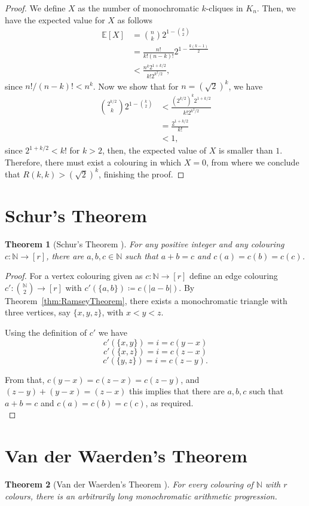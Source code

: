 \documentclass[12pt,twoside,a4paper,bibliography=totocnumbered]{book}
\numberwithin{equation}{section}
\newtheorem{theorem}             {Theorem}[section]
\theoremstyle{remark}
\begin{document}
\begin{proof}
We define $X$ as the number of monochromatic $k$-cliques in $K_n$. Then, we have the expected value for $X$ as follows
\begin{align*}
\mathbb{E}[X] &= \binom{n}{k}2^{1-\binom{k}{2}}\\ 
&= \frac{n!}{k!(n-k)!}2^{1-\frac{k(k-1)}{2}}\\ 
&< \frac{n^k 2^{1 +k/2}}{k!2^{k^2/2}},
\end{align*}
since $n!/(n-k)! < n^k$. Now we show that for $n = (\sqrt{2})^k$, we have
\begin{align*}
\binom{2^{k/2}}{k}2^{1-\binom{k}{2}}&< \frac{(2^{k/2})^k 2^{1+k/2}}{k! 2^{k^2/2}}\\ 
&= \frac{2^{1+k/2}}{k!}\\ 
&< 1,
\end{align*}
since $2^{1+k/2} < k!$ for $k>2$, then, the expected value of $X$ is smaller than $1$. Therefore, there must exist a colouring in which $X=0$, from where we conclude that $R(k,k) > (\sqrt{2})^k$, finishing the proof.
\end{proof}

\section{Schur's Theorem}
\begin{theorem}[{Schur's Theorem \cite{Sc16}}]\label{thm:Schur'sTheorem} %
For any positive integer and any colouring $c\colon \mathbb{N} \rightarrow [r]$, there are $a,b,c \in \mathbb{N}$ such that $a+b=c$ and $c(a) = c(b) = c(c)$.
\end{theorem}
\begin{proof}
  For a vertex colouring given as $c\colon \mathbb{N} \rightarrow [r]$ define an edge colouring $c'\colon \binom{\mathbb{N}}{2} \rightarrow [r]$ with $c'(\{a,b\}) \coloneqq c(|a-b|)$. By Theorem~\ref{thm:RamseyTheorem}, there exists a monochromatic triangle with three vertices, say $\{x,y,z\}$, with $x<y<z$.
  
Using the definition of $c'$  we have
$$c'(\{x,y\}) = i = c(y-x)$$
$$c'(\{x,z\})=  i = c(z-x)$$
$$c'(\{y,z\}) = i = c(z-y).$$

From that, $c(y-x) = c(z-x) = c(z-y)$, and $(z-y)+(y-x)=(z-x)$ this implies that there are $a,b,c$ such that $a+b=c$ and $c(a) = c(b) = c(c)$, as required.\\
\end{proof}

\section{Van der Waerden's Theorem}
\begin{theorem}[{Van der Waerden's Theorem \cite{Van27}}] %
 For every colouring of  $\mathbb{N}$ with $r$ colours, there is an arbitrarily long monochromatic arithmetic progression. 
\end{theorem}
\end{document}
